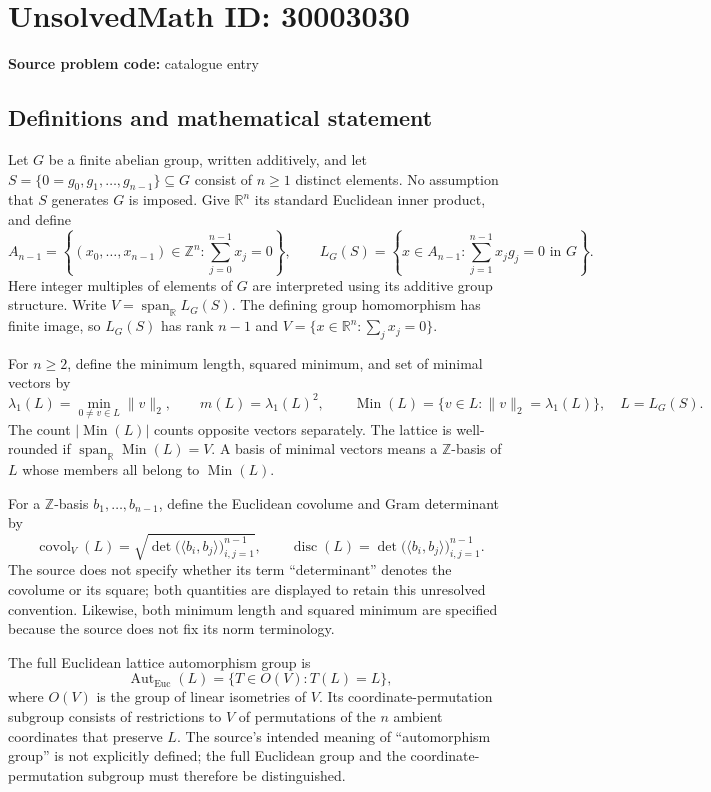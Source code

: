 \documentclass[11pt]{article}
\newcommand{\Z}{\mathbb{Z}}
\newcommand{\R}{\mathbb{R}}
\begin{document}
\section*{UnsolvedMath ID: 30003030}
\textbf{Source problem code:} catalogue entry
\subsection{Definitions and mathematical statement}
Let \(G\) be a finite abelian group, written additively, and let \(S=\{0=g_0,g_1,\ldots,g_{n-1}\}\subseteq G\) consist of \(n\geq 1\) distinct elements. No assumption that \(S\) generates \(G\) is imposed. Give \(\R^n\) its standard Euclidean inner product, and define
\[
A_{n-1}=\left\{(x_0,\ldots,x_{n-1})\in\Z^n:\sum_{j=0}^{n-1}x_j=0\right\},\qquad
L_G(S)=\left\{x\in A_{n-1}:\sum_{j=1}^{n-1}x_jg_j=0\text{ in }G\right\}.
\]
Here integer multiples of elements of \(G\) are interpreted using its additive group structure. Write \(V=\operatorname{span}_{\R}L_G(S)\). The defining group homomorphism has finite image, so \(L_G(S)\) has rank \(n-1\) and \(V=\{x\in\R^n:\sum_jx_j=0\}\).

For \(n\geq2\), define the minimum length, squared minimum, and set of minimal vectors by
\[
\lambda_1(L)=\min_{0\ne v\in L}\|v\|_2,\qquad
m(L)=\lambda_1(L)^2,\qquad
\operatorname{Min}(L)=\{v\in L:\|v\|_2=\lambda_1(L)\},
\quad L=L_G(S).
\]
The count \(|\operatorname{Min}(L)|\) counts opposite vectors separately. The lattice is well-rounded if \(\operatorname{span}_{\R}\operatorname{Min}(L)=V\). A basis of minimal vectors means a \(\Z\)-basis of \(L\) whose members all belong to \(\operatorname{Min}(L)\).

For a \(\Z\)-basis \(b_1,\ldots,b_{n-1}\), define the Euclidean covolume and Gram determinant by
\[
\operatorname{covol}_V(L)=\sqrt{\det\bigl(\langle b_i,b_j\rangle\bigr)_{i,j=1}^{n-1}},\qquad
\operatorname{disc}(L)=\det\bigl(\langle b_i,b_j\rangle\bigr)_{i,j=1}^{n-1}.
\]
The source does not specify whether its term ``determinant'' denotes the covolume or its square; both quantities are displayed to retain this unresolved convention. Likewise, both minimum length and squared minimum are specified because the source does not fix its norm terminology.

The full Euclidean lattice automorphism group is
\[
\operatorname{Aut}_{\mathrm{Euc}}(L)=\{T\in O(V):T(L)=L\},
\]
where \(O(V)\) is the group of linear isometries of \(V\). Its coordinate-permutation subgroup consists of restrictions to \(V\) of permutations of the \(n\) ambient coordinates that preserve \(L\). The source's intended meaning of ``automorphism group'' is not explicitly defined; the full Euclidean group and the coordinate-permutation subgroup must therefore be distinguished.
\end{document}
